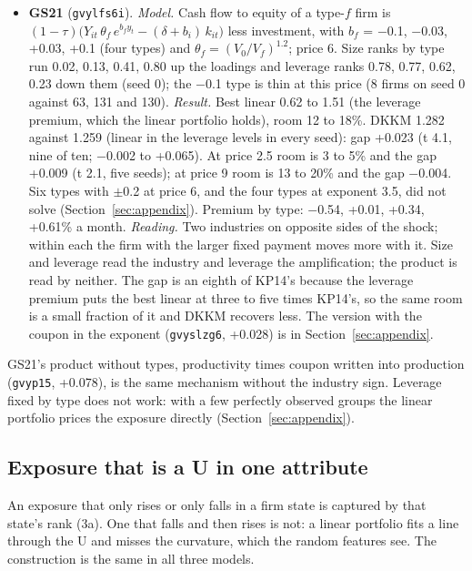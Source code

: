 \documentclass[11pt]{article}
\begin{document}
\begin{itemize}
\item \textbf{GS21} (\texttt{gvylfs6i}). \emph{Model.} Cash flow to equity of a type-$f$ firm is $(1-\tau)\big(Y_{it}\,\theta_f\,e^{b_f y_t} - (\delta + b_i)\,k_{it}\big)$ less investment, with $b_f$ = $-$0.1, $-$0.03, +0.03, +0.1 (four types) and $\theta_f = (V_0/V_f)^{1.2}$; price 6. Size ranks by type run 0.02, 0.13, 0.41, 0.80 up the loadings and leverage ranks 0.78, 0.77, 0.62, 0.23 down them (seed 0); the $-$0.1 type is thin at this price (8 firms on seed 0 against 63, 131 and 130). \emph{Result.} Best linear 0.62 to 1.51 (the leverage premium, which the linear portfolio holds), room 12 to 18\%. DKKM 1.282 against 1.259 (linear in the leverage levels in every seed): gap +0.023 (t 4.1, nine of ten; $-$0.002 to +0.065). At price 2.5 room is 3 to 5\% and the gap +0.009 (t 2.1, five seeds); at price 9 room is 13 to 20\% and the gap $-$0.004. Six types with $\pm$0.2 at price 6, and the four types at exponent 3.5, did not solve (Section~\ref{sec:appendix}). Premium by type: $-$0.54, +0.01, +0.34, +0.61\% a month. \emph{Reading.} Two industries on opposite sides of the shock; within each the firm with the larger fixed payment moves more with it. Size and leverage read the industry and leverage the amplification; the product is read by neither. The gap is an eighth of KP14's because the leverage premium puts the best linear at three to five times KP14's, so the same room is a small fraction of it and DKKM recovers less. The version with the coupon in the exponent (\texttt{gvyslzg6}, +0.028) is in Section~\ref{sec:appendix}.
\end{itemize}
GS21's product without types, productivity times coupon written into production (\texttt{gvyp15}, +0.078), is the same mechanism without the industry sign. Leverage fixed by type does not work: with a few perfectly observed groups the linear portfolio prices the exposure directly (Section~\ref{sec:appendix}).

\subsection{Exposure that is a U in one attribute}

An exposure that only rises or only falls in a firm state is captured by that state's rank (3a). One that falls and then rises is not: a linear portfolio fits a line through the U and misses the curvature, which the random features see. The construction is the same in all three models.
\end{document}
